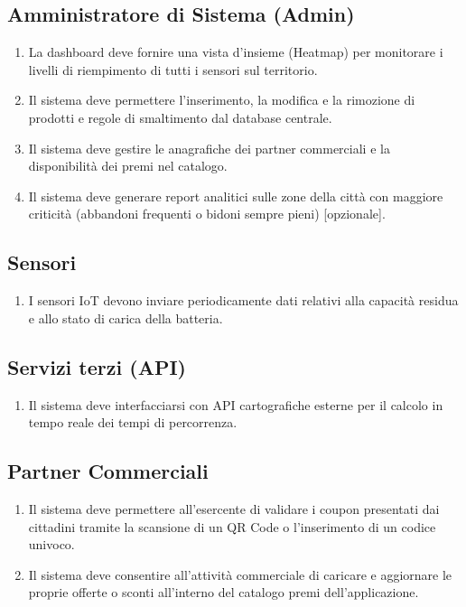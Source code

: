 \documentclass[12pt,a4paper]{article}
\begin{document}
\subsection{Amministratore di Sistema (Admin)}
\begin{enumerate}[label=\textbf{(RF\arabic*)}, resume]
    \item La dashboard deve fornire una vista d'insieme (Heatmap) per monitorare i livelli di riempimento di tutti i sensori sul territorio.
    \item Il sistema deve permettere l'inserimento, la modifica e la rimozione di prodotti e regole di smaltimento dal database centrale.
    \item Il sistema deve gestire le anagrafiche dei partner commerciali e la disponibilità dei premi nel catalogo.
    \item Il sistema deve generare report analitici sulle zone della città con maggiore criticità (abbandoni frequenti o bidoni sempre pieni) [opzionale].
\end{enumerate}

\subsection{Sensori}
\begin{enumerate}[label=\textbf{(RF\arabic*)}, resume]
    \item I sensori IoT devono inviare periodicamente dati relativi alla capacità residua e allo stato di carica della batteria.
\end{enumerate}

\subsection{Servizi terzi (API)}
\begin{enumerate}[label=\textbf{(RF\arabic*)}, resume]
    \item Il sistema deve interfacciarsi con API cartografiche esterne per il calcolo in tempo reale dei tempi di percorrenza.
\end{enumerate}

\subsection{Partner Commerciali }
\begin{enumerate}[label=\textbf{(RF\arabic*)}, resume]
    \item Il sistema deve permettere all'esercente di validare i coupon presentati dai cittadini tramite la scansione di un QR Code o l'inserimento di un codice univoco.
    \item Il sistema deve consentire all'attività commerciale di caricare e aggiornare le proprie offerte o sconti all'interno del catalogo premi dell'applicazione.
\end{enumerate}
\end{document}
